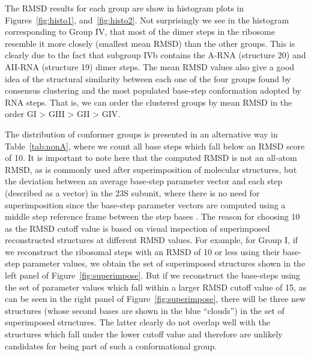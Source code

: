 The  RMSD  results for  each  group are  show  in  histogram plots  in
Figures~\ref{fig:histo1},  and~\ref{fig:histo2}.  Not  surprisingly we
see in the histogram corresponding to Group IV, that most of the dimer
steps in  the ribosome resemble  it more closely (smallest  mean RMSD)
than the other  groups. This is clearly due to  the fact that subgroup
IVb contains the A-RNA (structure 20) and AII-RNA (structure 19) dimer
steps.  The mean  RMSD values also give a good  idea of the structural
similarity  between each  one of  the four  groups found  by consensus
clustering and  the most  populated base-step conformation  adopted by
RNA steps. That is, we can  order the clustered groups by mean RMSD in
the order GI > GIII > GII > GIV.

The distribution  of conformer groups  is presented in  an alternative
way in Table~\ref{tab:nonA}, where we  count all base steps which fall
below an  RMSD score  of 10.  It  is important  to note here  that the
computed  RMSD is  not an  all-atom RMSD,  as is  commonly  used after
superimposition of molecular structures,  but the deviation between an
average  base-step parameter  vector  and each  step  (described as  a
vector) in the 23S subunit, where there is no need for superimposition
since the base-step parameter vectors are computed using a middle step
reference frame between the  step bases \cite{lu2003}.  The reason for
choosing 10 as the RMSD cutoff  value is based on visual inspection of
superimposed  reconstructed structures at  different RMSD  values. For
example, for  Group I, if we  reconstruct the ribosomal  steps with an
RMSD of 10  or less using their base-step  parameter values, we obtain
the  set  of  superimposed  structures  shown in  the  left  panel  of
Figure~\ref{fig:superimpose}.   But if  we reconstruct  the base-steps
using  the set of  parameter values  which fall  within a  larger RMSD
cutoff  value  of   15,  as  can  be  seen  in   the  right  panel  of
Figure~\ref{fig:superimpose},  there  will  be  three  new  structures
(whose second  bases are shown in  the blue ``clouds'') in  the set of
superimposed structures.  The latter clearly do not  overlap well with
the structures which  fall under the lower cutoff  value and therefore
are unlikely candidates for being part of such a conformational group.
  
